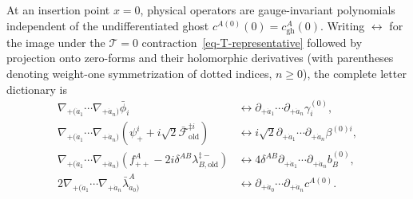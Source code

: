 \documentclass[11pt]{article}
\numberwithin{equation}{section}
\numberwithin{figure}{section}
\numberwithin{table}{section}
\begin{document}
At an insertion point $x=0$, physical operators are gauge-invariant polynomials independent of the undifferentiated ghost $c^{A(0)}(0)=c_{\mathrm{gh}}^A(0)$. Writing $\longleftrightarrow$ for the image under the $\mathcal T=0$ contraction~\eqref{eq-T-representative} followed by projection onto zero-forms and their holomorphic derivatives (with parentheses denoting weight-one symmetrization of dotted indices, $n\ge0$), the complete letter dictionary is
\begin{equation}\label{eq-B-14}
\begin{aligned}
\nabla_{+(\dot a_1}\cdots\nabla_{+\dot a_n)}\bar\phi_i
&\longleftrightarrow
\partial_{+\dot a_1}\cdots\partial_{+\dot a_n}\gamma_i^{(0)},\\
\nabla_{+(\dot a_1}\cdots\nabla_{+\dot a_n)}
\left(\psi_+^i+i\sqrt2\bar{\mathcal F}_{\mathrm{old}}^{\ddagger i}\right)
&\longleftrightarrow
 i\sqrt2\partial_{+\dot a_1}\cdots\partial_{+\dot a_n}\beta^{(0)i},\\
\nabla_{+(\dot a_1}\cdots\nabla_{+\dot a_n)}
\left(f_{++}^A-2i\delta^{AB}\lambda_{B,\mathrm{old}}^{\ddagger-}\right)
&\longleftrightarrow
 4\delta^{AB}\partial_{+\dot a_1}\cdots\partial_{+\dot a_n}b_B^{(0)},\\
2\nabla_{+(\dot a_1}\cdots\nabla_{+\dot a_n}\bar\lambda_{\dot a_0)}^A
&\longleftrightarrow
\partial_{+\dot a_0}\cdots\partial_{+\dot a_n}c^{A(0)}.
\end{aligned}
\end{equation}
\end{document}
